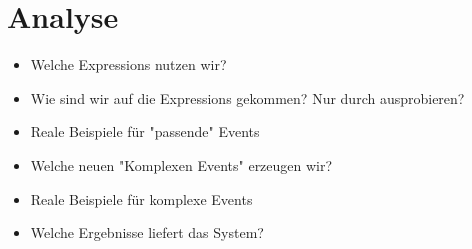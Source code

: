 \section{Analyse}
\begin{itemize}
    \item Welche Expressions nutzen wir?
    \item Wie sind wir auf die Expressions gekommen? Nur durch ausprobieren?
    \item Reale Beispiele für "passende" Events
    \item Welche neuen "Komplexen Events" erzeugen wir?
    \item Reale Beispiele für komplexe Events
    \item Welche Ergebnisse liefert das System?
\end{itemize}